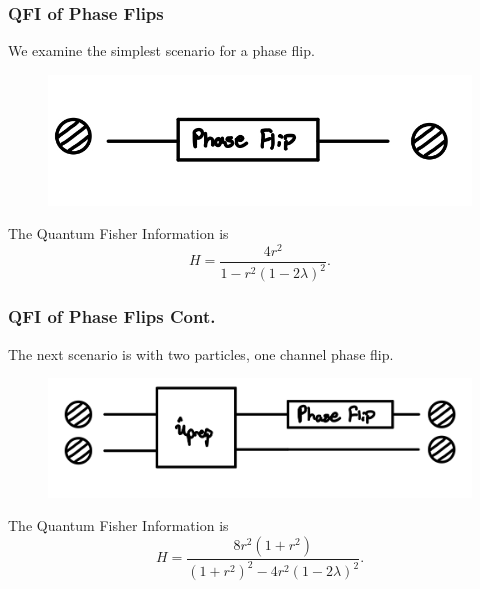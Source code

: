 \documentclass{beamer}
\begin{document}
\begin{frame}
\frametitle{QFI of Phase Flips}
We examine the simplest scenario for a phase flip.
\begin{figure}
\begin{center}
\includegraphics[width=0.60\linewidth]{Single-Particle-Phase-Flip-Evolution-Schematic.jpg}
\end{center}
\end{figure}
The Quantum Fisher Information is
\begin{equation}\label{eq:38}
H=\frac{4r^2}{1-r^2(1-2\lambda)^2}.
\end{equation}
\end{frame}
\begin{frame}
\frametitle{QFI of Phase Flips Cont.}
The next scenario is with two particles, one channel phase flip.
\begin{figure}
\begin{center}
\includegraphics[width=0.60\linewidth]{Two-Particle-Phase-Flip-Single-Channel-Lambda-Schematic.jpeg}
\end{center}
\end{figure}
The Quantum Fisher Information is
\begin{equation}\label{eq:39}
H=\frac{8r^2(1+r^2)}{(1+r^2)^2-4r^2(1-2\lambda)^2}.
\end{equation}
\end{frame}
\end{document}
